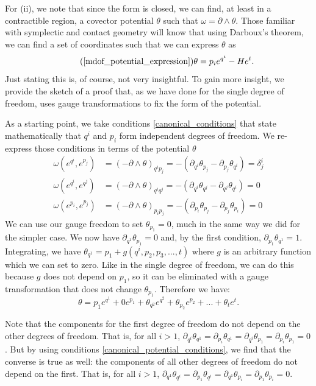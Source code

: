\documentclass[fleqn,10pt]{wlscirep}
\begin{document}
For (ii), we note that since the form is closed, we can find, at least in a contractible region, a covector potential $\theta$ such that $\omega=\partial \wedge \theta$. Those familiar with symplectic and contact geometry will know that using Darboux's theorem, we can find a set of coordinates such that we can express $\theta$ as
\begin{equation}
	\tag*{(\ref{mdof_potential_expression})}
	\theta = p_i e^{q^i} - H e^t.
\end{equation}
Just stating this is, of course, not very insightful. To gain more insight, we provide the sketch of a proof that, as we have done for the single degree of freedom, uses gauge transformations to fix the form of the potential. 

As a starting point, we take conditions \ref{canonical_conditions} that state mathematically that $q^i$ and $p_i$ form independent degrees of freedom. We re-express those conditions in terms of the potential $\theta$
\begin{equation}\label{canonical_potential_conditions}
\begin{aligned}
	\omega(e^{q^i}, e^{p_j}) &= (-\partial \wedge\theta)_{q^i p_j} = -(\partial_{q^i}\theta_{p_j} - \partial_{p_j}\theta_{q^i}) = \delta^i_j \\
	\omega(e^{q^i}, e^{q^j}) &= (-\partial \wedge\theta)_{q^i q^j} = -(\partial_{q^i}\theta_{q^j} - \partial_{q^j}\theta_{q^i}) = 0 \\
	\omega(e^{p_i}, e^{p_j}) &= (-\partial \wedge\theta)_{p_i p_j} = -(\partial_{p_i}\theta_{p_j} - \partial_{p_j}\theta_{p_i}) = 0
\end{aligned}
\end{equation}
We can use our gauge freedom to set $\theta_{p_1} = 0$, much in the same way we did for the simpler case. We now have $\partial_{q^1} \theta_{p_1} = 0$ and, by the first condition, $\partial_{p_1} \theta_{q^1} = 1$. Integrating, we have $\theta_{q^1} = p_1 + g(q^i, p_2, p_3, ..., t)$ where $g$ is an arbitrary function which we can set to zero. Like in the single degree of freedom, we can do this because $g$ does not depend on $p_1$, so it can be eliminated with a gauge transformation that does not change $\theta_{p_1}$. Therefore we have:
\begin{equation}
	\theta = p_1 e^{q^1} + 0 e^{p_1} + \theta_{q^2} e^{q^2} + \theta_{p_2} e^{p_2} + ... + \theta_{t} e^{t}.
\end{equation}

Note that the components for the first degree of freedom do not depend on the other degrees of freedom. That is, for all $i>1$, $\partial_{q^i} \theta_{q^1} = \partial_{p_i} \theta_{q^1} = \partial_{q^i} \theta_{p_1} = \partial_{p_i} \theta_{p_1} = 0$. But by using conditions \ref{canonical_potential_conditions}, we find that the converse is true as well: the components of all other degrees of freedom do not depend on the first. That is, for all $i>1$, $\partial_{q^1} \theta_{q^i} = \partial_{p_1} \theta_{q^i} = \partial_{q^1} \theta_{p_i} = \partial_{p_1} \theta_{p_i} = 0$.
\end{document}
